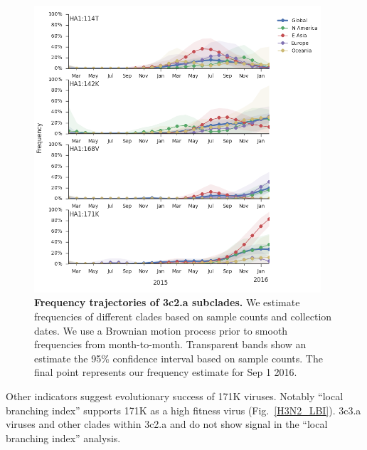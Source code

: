 \documentclass[11pt,oneside,letterpaper]{article}
\begin{document}
\begin{figure}[H]
	\centering
	\includegraphics[width=0.95\textwidth]{../figures/feb-2016/H3N2_mutations.png}
	\caption{\textbf{Frequency trajectories of 3c2.a subclades.}
	We estimate frequencies of different clades based on sample counts and collection dates.
	We use a Brownian motion process prior to smooth frequencies from month-to-month.
	Transparent bands show an estimate the 95\% confidence interval based on sample counts.
	The final point represents our frequency estimate for Sep 1 2016.
	}
	\label{H3N2_mutations}
\end{figure}

\pagebreak

Other indicators suggest evolutionary success of 171K viruses. Notably ``local branching index'' \cite{neher2014predicting} supports 171K as a high fitness virus (Fig.\ \ref{H3N2_LBI}). 3c3.a viruses and other clades within 3c2.a and do not show signal in the ``local branching index'' analysis.
\end{document}
